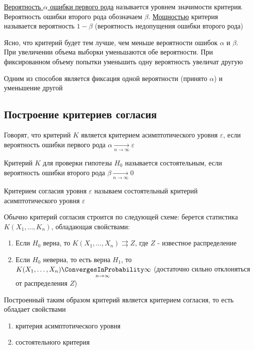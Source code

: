 \documentclass[12pt]{article}
\begin{document}
\Defs \underline{Вероятность $\alpha$ ошибки первого рода} называется уровнем значимости критерия. 
Вероятность ошибки второго рода обозначаем $\beta$. \underline{Мощностью} критерия называется вероятность $1 - \beta$ (вероятность
недопущения ошибки второго рода)

Ясно, что критерий будет тем лучше, чем меньше вероятности ошибок $\alpha$ и $\beta$. При увеличении объема
выборки уменьшаются обе вероятности. При фиксированном объему попытки уменьшить одну вероятность
увеличат другую

Одним из способов является фиксация одной вероятности (принято $\alpha$) и уменьшение другой

\subsection{Построение критериев согласия}

\Def Говорят, что критерий $K$ является критерием асимптотического уровня $\varepsilon$, если 
вероятность ошибки первого рода $\alpha \underset{n \to \infty}{\longrightarrow} \varepsilon$

\Defs Критерий $K$ для проверки гипотезы $H_0$ называется состоятельным, если вероятность ошибки второго рода
$\beta \underset{n \to \infty}{\longrightarrow} 0$

\Defs Критерием согласия уровня $\varepsilon$ называем состоятельный критерий асимптотического уровня
$\varepsilon$

Обычно критерий согласия строится по следующей схеме: берется статистика $K(X_1, \dots, K_n)$, 
обладающая свойствами:

\begin{enumerate}
    \item Если $H_0$ верна, то $K(X_1, \dots, X_n) \rightrightarrows Z$, где $Z$ - известное распределение

    \item Если $H_0$ неверна, то есть верна $H_1$, то $K(X_1, \dots, X_n) \underset{n \to \infty}{\ConvergesInProbability} \infty$ 
    (достаточно сильно отклоняться от распределения $Z$)
\end{enumerate}

\begin{MyTheorem}
    Построенный таким образом критерий является критерием согласия, то есть обладает свойствами

    \begin{enumerate}
        \item критерия асимптотического уровня
        \item состоятельного критерия
    \end{enumerate}
\end{MyTheorem}
\end{document}
